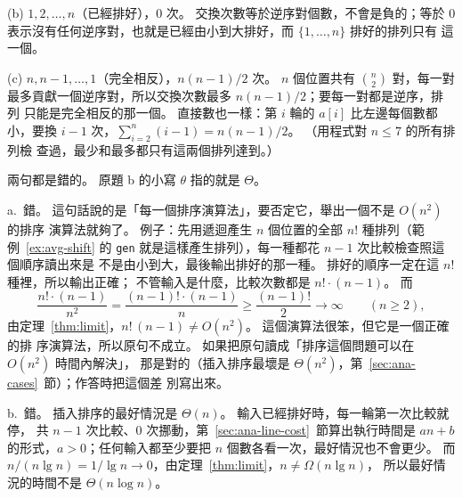 (b) $1, 2, \ldots, n$（已經排好），$0$ 次。 交換次數等於逆序對個數，不會是負的；等於
$0$ 表示沒有任何逆序對，也就是已經由小到大排好，而 $\{1, \ldots, n\}$ 排好的排列只有
這一個。

(c) $n, n-1, \ldots, 1$（完全相反），$n(n-1)/2$ 次。 $n$ 個位置共有 $\binom{n}{2}$
對，每一對最多貢獻一個逆序對，所以交換次數最多 $n(n-1)/2$；要每一對都是逆序，排列
只能是完全相反的那一個。 直接數也一樣：第 $i$ 輪的 $a[i]$ 比左邊每個數都小，要換
$i - 1$ 次，$\sum_{i=2}^{n} (i - 1) = n(n-1)/2$。 （用程式對 $n \le 7$ 的所有排列檢
查過，最少和最多都只有這兩個排列達到。）

兩句都是錯的。 原題 b 的小寫 $\theta$ 指的就是 $\Theta$。

a.\ 錯。 這句話說的是「每一個排序演算法」，要否定它，舉出一個不是 $O(n^2)$ 的排序
演算法就夠了。 例子：先用遞迴產生 $n$ 個位置的全部 $n!$ 種排列（範例~\ref{ex:avg-shift}
的 \texttt{gen} 就是這樣產生排列），每一種都花 $n - 1$ 次比較檢查照這個順序讀出來是
不是由小到大，最後輸出排好的那一種。 排好的順序一定在這 $n!$ 種裡，所以輸出正確；
不管輸入是什麼，比較次數都是 $n! \cdot (n - 1)$。 而
\[
\frac{n! \cdot (n-1)}{n^2} = \frac{(n-1)! \cdot (n-1)}{n} \ge \frac{(n-1)!}{2} \to \infty
\qquad (n \ge 2),
\]
由定理~\ref{thm:limit}，$n!\,(n-1) \ne O(n^2)$。 這個演算法很笨，但它是一個正確的排
序演算法，所以原句不成立。 如果把原句讀成「排序這個問題可以在 $O(n^2)$ 時間內解決」，
那是對的（插入排序最壞是 $\Theta(n^2)$，第~\ref{sec:ana-cases}~節）；作答時把這個差
別寫出來。

b.\ 錯。 插入排序的最好情況是 $\Theta(n)$。 輸入已經排好時，每一輪第一次比較就停，
共 $n - 1$ 次比較、$0$ 次挪動，第~\ref{sec:ana-line-cost}~節算出執行時間是 $an + b$
的形式，$a > 0$；任何輸入都至少要把 $n$ 個數各看一次，最好情況也不會更少。 而
$n / (n \lg n) = 1 / \lg n \to 0$，由定理~\ref{thm:limit}，$n \ne \Omega(n \lg n)$，
所以最好情況的時間不是 $\Theta(n \log n)$。
